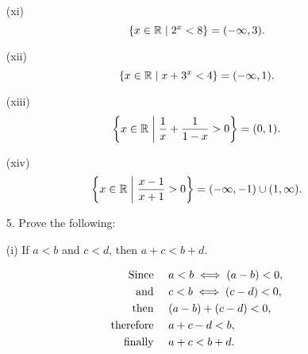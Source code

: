 \documentclass[11pt]{article}
\begin{document}
\begin{enumerate}
    \item[(xi)]
          \[
              \left\{  x \in \mathbb{R}  \;\middle|\;  2^x < 8  \right\} = (-\infty, 3).
          \]

    \item[(xii)]
          \[
              \left\{  x \in \mathbb{R}  \;\middle|\;  x + 3^x < 4  \right\} = (-\infty, 1).
          \]

    \item[(xiii)]
          \[
              \left\{  x \in \mathbb{R}  \;\middle|\;  \dfrac{1}{x} + \dfrac{1}{1 - x} > 0  \right\} = (0, 1).
          \]

    \item[(xiv)]
          \[
              \left\{  x \in \mathbb{R}  \;\middle|\;  \dfrac{x - 1}{x + 1} > 0  \right\} = (-\infty, -1) \cup (1, \infty).
          \]

    \item[5.] Prove the following:

    \item[(i)] If $a < b$ and $c < d$, then $a + c < b + d$.

          \[
              \begin{aligned}
                  \text{Since \quad}     & a < b \iff (a - b) < 0, \\
                  \text{and \quad}       & c < b \iff (c - d) < 0, \\
                  \text{then \quad}      & (a - b) + (c - d) < 0,  \\
                  \text{therefore \quad} & a + c - d < b,          \\
                  \text{finally \quad}   & a + c < b + d.
              \end{aligned}
          \]


\end{enumerate}
\end{document}
